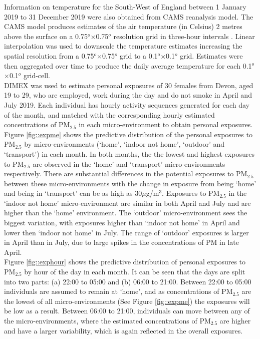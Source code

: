 \documentclass{article}
\begin{document}
\noindent Information on temperature for the South-West of England between 1 January 2019 to 31 December 2019 were also obtained from CAMS reanalysis model. The CAMS model produces estimates of the air temperature (in Celsius) 2 metres above the surface on a 0.75$^{o}$$\times$0.75$^{o}$ resolution grid in three-hour intervals \citep{CAMS}. Linear interpolation was used to downscale the temperature estimates increasing the spatial resolution from a 0.75$^{o}$$\times$0.75$^{o}$ grid to a 0.1$^{o}$$\times$0.1$^{o}$ grid. Estimates were then aggregated over time to produce the daily average temperature for each 0.1$^{o}$$\times$0.1$^{o}$ grid-cell.  \\

\noindent DIMEX was used to estimate personal exposures of 30 females from Devon, aged 19 to 29, who are employed, work during the day and do not smoke in April and July 2019. Each individual has hourly activity sequences generated for each day of the month, and matched with the corresponding hourly estimated concentrations of PM$_{2.5}$ in each micro-environment to obtain personal exposures.  Figure \ref{fig::expme} shows the predictive distribution of the personal exposures to PM$_{2.5}$ by micro-environments (`home', `indoor not home', `outdoor' and `transport') in each month. In both months, the the lowest and highest exposures to PM$_{2.5}$ are observed in the `home' and `transport' micro-environments respectively. There are substantial differences in the potential exposures to PM$_{2.5}$ between these micro-environments with the change in exposure from being `home' and being in `transport' can be as high as 30$\mu$g/m$^3$. Exposures to PM$_{2.5}$ in the `indoor not home' micro-environment are similar in both April and July and are higher than the `home' environment. The `outdoor' micro-environment sees the biggest variation, with exposures higher than `indoor not home' in April and lower then `indoor not home' in July. The range of `outdoor' exposures is larger in April than in July, due to large spikes in the concentrations of PM in late April. \\

\noindent Figure \ref{fig::exphour} shows the predictive distribution of personal exposures to PM$_{2.5}$ by hour of the day in each month. It can be seen that the days are split into two parts: (a) 22:00 to 05:00 and (b) 06:00 to 21:00. Between 22:00 to 05:00 individuals are assumed to remain at `home', and as concentrations of PM$_{2.5}$ are the lowest of all micro-environments (See Figure \ref{fig::expme}) the exposures will be low as a result. Between 06:00 to 21:00, individuals can move between any of the micro-environments, where the estimated concentrations of PM$_{2.5}$ are higher and have a larger variability, which is again reflected in the overall exposures. \\
\end{document}
